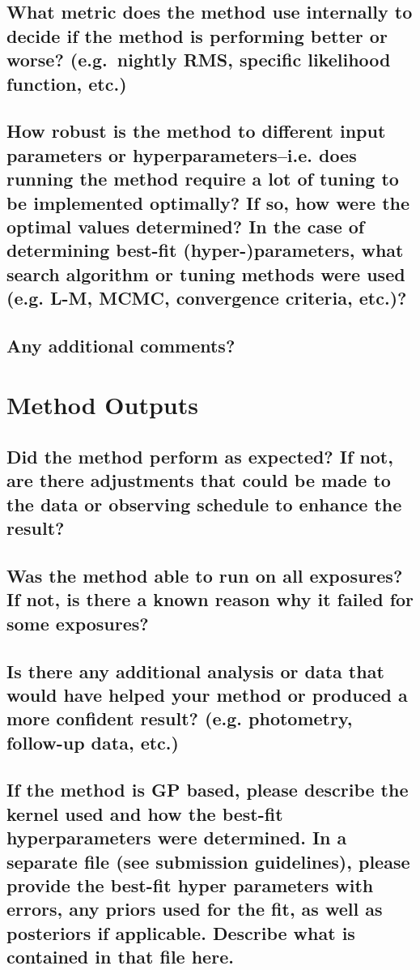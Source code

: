 \documentclass[12pt]{article}
\numberwithin{equation}{section}
\begin{document}
\subsection{What metric does the method use internally to decide if the method is performing better or worse?  (e.g.\ nightly RMS, specific likelihood function, etc.)}

\subsection{How robust is the method to different input parameters or hyperparameters--i.e. does running the method require a lot of tuning to be implemented optimally?  If so, how were the optimal values determined? In the case of determining best-fit (hyper-)parameters, what search algorithm or tuning methods were used (e.g. L-M, MCMC, convergence criteria, etc.)?}

\subsection{Any additional comments?}


\section{Method Outputs}
\subsection{Did the method perform as expected?  If not, are there adjustments that could be made to the data or observing schedule to enhance the result?}

\subsection{Was the method able to run on all exposures?  If not, is there a known reason why it failed for some exposures?}

\subsection{Is there any additional analysis or data that would have helped your method or produced a more confident result?  (e.g. photometry, follow-up data, etc.)}

\subsection{If the method is GP based, please describe the kernel used and how the best-fit hyperparameters were determined.   In a separate file (see submission guidelines), please provide the best-fit hyper parameters with errors, any priors used for the fit, as well as posteriors if applicable.  Describe what is contained in that file here.}
\end{document}
